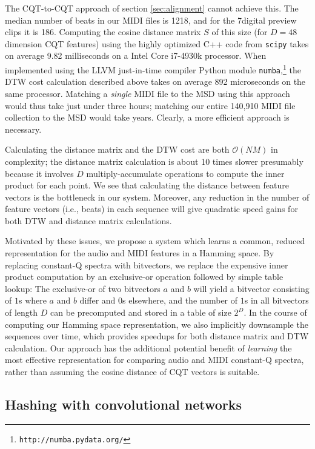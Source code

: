 \documentclass{article}
\begin{document}
The CQT-to-CQT approach of section \ref{sec:alignment} cannot achieve this.
The median number of beats in our MIDI files is 1218, and for the 7digital preview clips it is 186.
Computing the cosine distance matrix $S$ of this size (for $D=48$ dimension CQT features) using the highly optimized C++ code from \texttt{scipy} \cite{jones2014scipy} takes on average 9.82 milliseconds on a Intel Core i7-4930k processor.
When implemented using the LLVM just-in-time compiler Python module \texttt{numba},\footnote{\texttt{http://numba.pydata.org/}} the DTW cost calculation described above takes on average 892 microseconds on the same processor.
Matching a \textit{single} MIDI file to the MSD using this approach would thus take just under three hours; matching our entire 140,910 MIDI file collection to the MSD would take years.
Clearly, a more efficient approach is necessary.

Calculating the distance matrix and the DTW cost are both $\mathcal{O}(NM)$ in complexity; the distance matrix calculation is about 10 times slower presumably because it involves $D$ multiply-accumulate operations to compute the inner product for each point.
We see that calculating the distance between feature vectors is the bottleneck in our system.
Moreover, any reduction in the number of feature vectors (i.e., beats) in each sequence will give quadratic speed gains for both DTW and distance matrix calculations.

Motivated by these issues, we propose a system which learns a common, reduced representation for the audio and MIDI features in a Hamming space.
By replacing constant-Q spectra with bitvectors, we replace the expensive inner product computation by an exclusive-or operation followed by simple table lookup: The exclusive-or of two bitvectors $a$ and $b$ will yield a bitvector consisting of $1$s where $a$ and $b$ differ and $0$s elsewhere, and the number of $1$s in all bitvectors of length $D$ can be precomputed and stored in a table of size $2^D$.  
In the course of computing our Hamming space representation, we also implicitly downsample the sequences over time, which provides speedups for both distance matrix and DTW calculation.
Our approach has the additional potential benefit of {\em learning} the most effective representation for comparing audio and MIDI constant-Q spectra, rather than assuming the cosine distance of CQT vectors is suitable.

\subsection{Hashing with convolutional networks}
\end{document}

